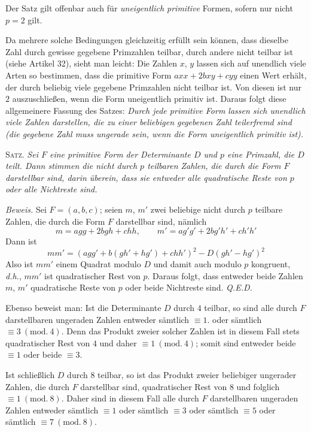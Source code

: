 Der Satz gilt offenbar auch für \textit{uneigentlich primitive} Formen, sofern nur nicht $p=2$ gilt.

Da mehrere solche Bedingungen gleichzeitig erfüllt sein können, dass dieselbe Zahl durch gewisse gegebene Primzahlen teilbar, durch andere nicht teilbar ist (siehe Artikel 32), sieht man leicht: Die Zahlen $x$, $y$ lassen sich auf unendlich viele Arten so bestimmen, dass die primitive Form $axx+2bxy+cyy$ einen Wert erhält, der durch beliebig viele gegebene Primzahlen nicht teilbar ist. Von diesen ist nur $2$ auszuschließen, wenn die Form uneigentlich primitiv ist. Daraus folgt diese allgemeinere Fassung des Satzes: \textit{Durch jede primitive Form lassen sich unendlich viele Zahlen darstellen, die zu einer beliebigen gegebenen Zahl teilerfremd sind (die gegebene Zahl muss ungerade sein, wenn die Form uneigentlich primitiv ist).}

\textsc{Satz.} \textit{Sei $F$ eine primitive Form der Determinante $D$ und $p$ eine Primzahl, die $D$ teilt. Dann stimmen die nicht durch $p$ teilbaren Zahlen, die durch die Form $F$ darstellbar sind, darin überein, dass sie entweder alle quadratische Reste von $p$ oder alle Nichtreste sind.}

\textit{Beweis.} Sei $F=(a,b,c)$; seien $m$, $m'$ zwei beliebige nicht durch $p$ teilbare Zahlen, die durch die Form $F$ darstellbar sind, nämlich
\[
m=agg+2bgh+chh,\qquad m'=ag'g'+2bg'h'+ch'h'
\]
Dann ist
\[
mm'=(agg'+b(gh'+hg')+chh')^2-D(gh'-hg')^2
\]
Also ist $mm'$ einem Quadrat modulo $D$ und damit auch modulo $p$ kongruent, \textit{d.h.}, $mm'$ ist quadratischer Rest von $p$. Daraus folgt, dass entweder beide Zahlen $m$, $m'$ quadratische Reste von $p$ oder beide Nichtreste sind. \textit{Q.E.D.}

Ebenso beweist man: Ist die Determinante $D$ durch $4$ teilbar, so sind alle durch $F$ darstellbaren ungeraden Zahlen entweder sämtlich $\equiv1$. oder sämtlich $\equiv3\ (\mathrm{mod.}\ 4)$. Denn das Produkt zweier solcher Zahlen ist in diesem Fall stets quadratischer Rest von $4$ und daher $\equiv1\ (\mathrm{mod.}\ 4)$; somit sind entweder beide $\equiv1$ oder beide $\equiv3$.

Ist schließlich $D$ durch $8$ teilbar, so ist das Produkt zweier beliebiger ungerader Zahlen, die durch $F$ darstellbar sind, quadratischer Rest von $8$ und folglich $\equiv1\ (\mathrm{mod.}\ 8)$. Daher sind in diesem Fall alle durch $F$ darstellbaren ungeraden Zahlen entweder sämtlich $\equiv1$ oder sämtlich $\equiv3$ oder sämtlich $\equiv5$ oder sämtlich $\equiv7\ (\mathrm{mod.}\ 8)$.

